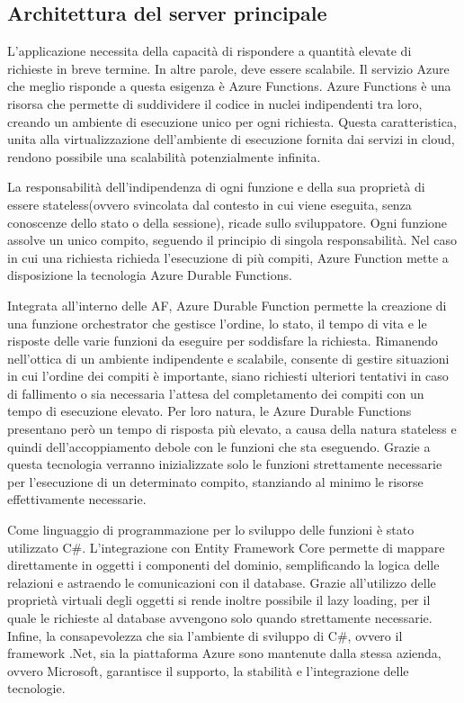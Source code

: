 \clearpage
\subsection{Architettura del server principale}
	
L’applicazione necessita della capacità di rispondere a quantità elevate di richieste in breve termine. In altre parole, deve essere scalabile. 
Il servizio Azure che meglio risponde a questa esigenza è Azure Functions. Azure Functions è una risorsa che permette di suddividere il codice in nuclei indipendenti tra loro, creando un ambiente di esecuzione unico per ogni richiesta. Questa caratteristica, unita alla virtualizzazione dell’ambiente di esecuzione fornita dai servizi in cloud, rendono possibile una scalabilità potenzialmente infinita.

La responsabilità dell’indipendenza di ogni funzione e della sua proprietà di essere stateless(ovvero svincolata dal contesto in cui viene eseguita, senza conoscenze dello stato o della sessione), ricade sullo sviluppatore. Ogni funzione assolve un unico compito, seguendo il principio di singola responsabilità. Nel caso in cui una richiesta richieda l’esecuzione di più compiti, Azure Function mette a disposizione la tecnologia Azure Durable Functions. 

Integrata all’interno delle AF, Azure Durable Function permette la creazione di una funzione orchestrator che gestisce l’ordine, lo stato, il tempo di vita e le risposte delle varie funzioni da eseguire per soddisfare la richiesta.
Rimanendo nell’ottica di un ambiente indipendente e scalabile, consente di gestire situazioni in cui l’ordine dei compiti è importante, siano richiesti ulteriori tentativi in caso di fallimento o sia necessaria l’attesa del completamento dei compiti con un tempo di esecuzione elevato.
Per loro natura, le Azure Durable Functions presentano però un tempo di risposta più elevato, a causa della natura stateless e quindi dell’accoppiamento debole con le funzioni che sta eseguendo.  
Grazie a questa tecnologia verranno inizializzate solo le funzioni strettamente necessarie per l’esecuzione di un determinato compito, stanziando al minimo le risorse effettivamente necessarie.

Come linguaggio di programmazione per lo sviluppo delle funzioni è stato utilizzato C\#. L’integrazione con Entity Framework Core permette di mappare direttamente in oggetti i componenti del dominio, semplificando la logica delle relazioni e astraendo le comunicazioni con il database. Grazie all’utilizzo delle proprietà virtuali degli oggetti si rende inoltre possibile il lazy loading, per il quale le richieste al database avvengono solo quando strettamente necessarie. Infine, la consapevolezza che sia l’ambiente di sviluppo di C\#, ovvero il framework .Net, sia la piattaforma Azure sono mantenute dalla stessa azienda, ovvero Microsoft, garantisce il supporto, la stabilità e l’integrazione delle tecnologie.

